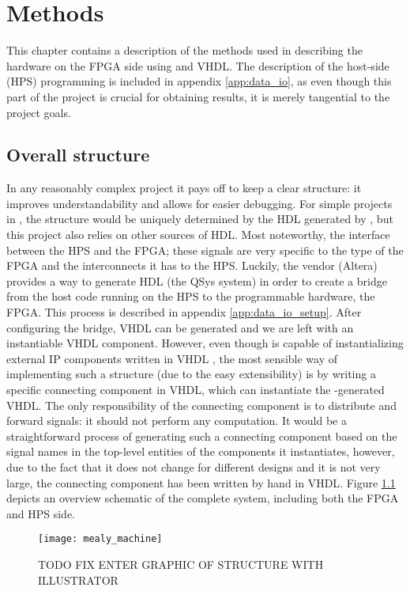 \chapter{Methods}
This chapter contains a description of the methods used in describing the hardware on the FPGA side using \clash{} and VHDL. The description of the host-side (HPS) programming is included in appendix \ref{app:data_io}, as even though this part of the project is crucial for obtaining results, it is merely tangential to the project goals. 

\section{Overall structure}
In any reasonably complex project it pays off to keep a clear structure: it improves understandability and allows for easier debugging. For simple projects in \clash{}, the structure would be uniquely determined by the HDL generated by \clash{}, but this project also relies on other sources of HDL. Most noteworthy, the interface between the HPS and the FPGA; these signals are very specific to the type of the FPGA and the interconnects it has to the HPS. Luckily, the vendor (Altera) provides a way to generate HDL (the QSys system) in order to create a bridge from the host code running on the HPS to the programmable hardware, the FPGA. This process is described in appendix \ref{app:data_io_setup}. After configuring the bridge, VHDL can be generated and we are left with an instantiable VHDL component. However, even though \clash{} is capable of instantializing external IP components written in VHDL \cite{CLaSHBlogTut}, the most sensible way of implementing such a structure (due to the easy extensibility) is by writing a specific connecting component in VHDL, which can instantiate the \clash{}-generated VHDL. The only responsibility of the connecting component is to distribute and forward signals: it should not perform any computation. It would be a straightforward process of generating such a connecting component based on the signal names in the top-level entities of the components it instantiates, however, due to the fact that it does not change for different designs and it is not very large, the connecting component has been written by hand in VHDL. Figure \ref{f:large_structure} depicts an overview schematic of the complete system, including both the FPGA and HPS side.

\begin{figure}[h]
	\centering
	\texttt{[image: mealy\_machine]}
	\caption{TODO FIX ENTER GRAPHIC OF STRUCTURE WITH ILLUSTRATOR}
	\label{f:large_structure}
\end{figure}

